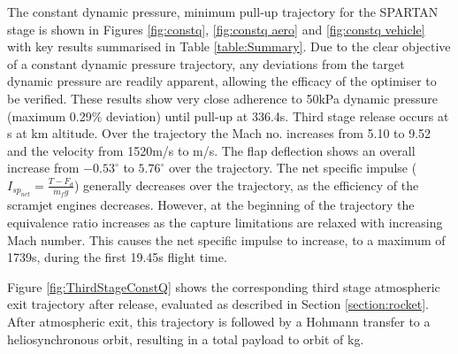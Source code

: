 The constant dynamic pressure, minimum pull-up trajectory for the SPARTAN stage is shown in Figures \ref{fig:constq}, \ref{fig:constq aero} and \ref{fig:constq vehicle} with key results summarised in Table \ref{table:Summary}. Due to the clear objective of a constant dynamic pressure trajectory, any deviations from the target dynamic pressure are readily apparent, allowing the efficacy of the optimiser to be verified. 
These results show very close adherence to 50kPa dynamic pressure (maximum 0.29\% deviation) until pull-up at 336.4s. Third stage release occurs at \FlightTimeConstq s at \SeparationAltConstq km altitude. 
Over the trajectory the Mach no. increases from 5.10 to 9.52 and the velocity from 1520m/s to \SeparationvConstq m/s. The flap deflection shows an overall increase from $-0.53^\circ$ to $5.76^\circ$ over the trajectory.  The net specific impulse ($I_{sp_{net}} = \frac{T-F_d}{\dot{m}_f g}$) generally decreases over the trajectory, as the efficiency of the scramjet engines decreases. However, at the beginning of the trajectory the equivalence ratio increases as the capture limitations are relaxed with increasing Mach number. This causes the net specific impulse to increase, to a maximum of 1739s, during the first 19.45s flight time. 

Figure \ref{fig:ThirdStageConstQ} shows the corresponding third stage atmospheric exit trajectory after release, evaluated as described in Section \ref{section:rocket}. After atmospheric exit, this trajectory is followed by a Hohmann transfer to a heliosynchronous orbit, resulting in a total payload to orbit of \PayloadToOrbitConstq kg.


